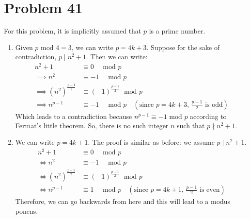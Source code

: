 \section*{Problem 41}
For this problem, it is implicitly assumed that $p$ is a prime number.
\begin{enumerate}
    \item Given $p \text{ mod } 4 = 3$, we can write $p = 4k + 3$. Suppose for the sake of contradiction, $p \mid n^2+1$. Then we can write:
          \begin{align*}
              n^2+1                        & \equiv 0 \quad \text{ mod } p                                                                    \\
              \implies n^2                 & \equiv -1 \quad \text{ mod } p                                                                   \\
              \implies (n^2)^\frac{p-1}{2} & \equiv (-1)^{\frac{p-1}{2}} \; \text{ mod } p                                                    \\
              \implies n^{p-1}             & \equiv -1 \quad \text{ mod } p \quad \left(\text{since $p=4k+3$, $\frac{p-1}{2} $ is odd}\right)
          \end{align*}
          Which leads to a contradiction because $n^{p-1}\equiv -1 \text{ mod } p$ according to Fermat's little theorem. So, there is no such integer $n$ such that $p \nmid n^2+1$.
    \item We can write $p = 4k + 1$. The proof is similar as before: we assume $p \mid n^2 + 1$.
          \begin{align*}
              n^2+1                                   & \equiv 0 \quad \text{ mod } p                                                                    \\
              \Longleftrightarrow n^2                 & \equiv -1 \quad \text{ mod } p                                                                   \\
              \Longleftrightarrow (n^2)^\frac{p-1}{2} & \equiv (-1)^{\frac{p-1}{2}} \; \text{ mod } p                                                    \\
              \Longleftrightarrow n^{p-1}             & \equiv 1 \quad \text{ mod } p \quad \left(\text{since $p=4k+1$, $\frac{p-1}{2} $ is even}\right)
          \end{align*}
          Therefore, we can go backwards from here and this will lead to a modus ponens.
\end{enumerate}

